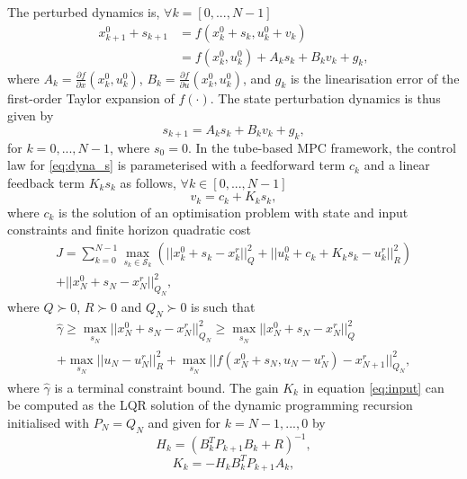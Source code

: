 \documentclass[letterpaper, 10 pt, conference]{ieeeconf}
\begin{document}
The perturbed dynamics is, $\forall k = [0, ..., N-1]$
%
\begin{align*}
x_{k+1}^0 + s_{k+1} &= f(x_k^0 + s_k, u_k^0 + v_k) \\
&= f(x_k^0, u_k^0) + A_k s_k + B_k v_k  + g_k, 
\end{align*}
where $A_k = \frac{\partial f}{\partial x}(x_k^0, u_k^0)$, $B_k = \frac{\partial f}{\partial u}(x_k^0, u_k^0)$, and $g_k$ is the linearisation error of the first-order Taylor expansion of $f(\cdot)$. The state perturbation dynamics is thus given by 
%
\begin{equation}
\label{eq:dyna_s}
s_{k+1} = A_k s_k + B_k v_k +  g_k, 
\end{equation}
%
for $k = 0, ..., N-1$, where $s_0 = 0$.  In the tube-based MPC framework, the control law for \eqref{eq:dyna_s} is parameterised with a feedforward term $c_k$ and a linear feedback term $K_k s_k$ as follows, $\forall k \in [0, ..., N-1]$
%
\begin{equation}
\label{eq:input}
v_k = c_k + K_k s_k, 
\end{equation} 
%
where $c_k$ is the solution of an optimisation problem with state and input constraints and finite horizon quadratic cost 
\small
\begin{align}
\label{eq:cost}
 J =  \sum_{k = 0}^{N-1} \max_{s_k \in \mathcal{S}_k}(|| x_k^0 + s_k - x_k^r ||_Q^2  + || u_k^0 + c_k + K_k s_k - u_k^r||_R^2) \nonumber\\+ || x_N^0 + s_N - x_N^r ||_{Q_N}^2,
\end{align}
\normalsize
where $Q \succ 0$, $R \succ 0$ and $Q_N \succ 0$ is such that 
%
\small
\begin{multline}
\label{eq:Q_N}
\hat{\gamma} \geq \max_{\substack{s_N}} || x_N^0 + s_N - x_N^r ||_{Q_N}^2 \geq \max_{\substack{s_N}} || x_N^0 + s_N - x_N^r ||_{Q}^2 \\   + \max_{\substack{s_N}} ||u_N - u_N^r||_{R}^2 + \max_{\substack{s_N}} || f(x_N^0 + s_N, u_N - u_N^r) - x_{N+1}^r||_{Q_N}^2,  
\end{multline}
\normalsize
where $\hat{\gamma}$ is a terminal constraint bound.
The gain $K_k$ in equation \eqref{eq:input} can be computed as the LQR solution of the dynamic programming recursion initialised with $P_N = Q_N$ and given for $k=N-1, ..., 0$ by
%
\begin{equation}
\label{eq:dp1}
H_k = (B_k^T P_{k+1} B_k + R)^{-1},  
\end{equation}
\begin{equation}
\label{eq:dp2}
K_k = -H_k B_k^TP_{k+1} A_k,
\end{equation}
\end{document}
